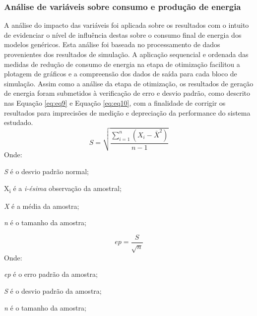 \subsubsection{Análise de variáveis sobre consumo e produção de energia}
\noindent A análise do impacto das variáveis foi aplicada sobre os resultados com o intuito de evidenciar o nível de influência destas sobre o consumo final de energia dos modelos genéricos. Esta análise foi baseada no processamento de dados provenientes dos resultados de simulação. A aplicação sequencial e ordenada das medidas de redução de consumo de energia na etapa de otimização facilitou a plotagem de gráficos e a compreensão dos dados de saída para cada bloco de simulação.\newline
\noindent Assim como a análise da etapa de otimização, os resultados de geração de energia foram submetidos à verificação de erro e desvio padrão, como descrito nas Equação \ref{eq:eq9} e Equação \ref{eq:eq10}, com a finalidade de corrigir os resultados para imprecisões de medição e depreciação da performance do sistema estudado.\newline
\begin{equation}\label{eq:eq9}
    S=\sqrt{\frac{\sum_{i=1}^{n}(X_i-\bar{X}^2)}{n-1}}
\end{equation}
\noindent Onde:\par
\setlength\parindent{1.5cm} \textit{S} é o desvio padrão normal;\par
\setlength\parindent{1.5cm} X\textsubscript{i} é a \textit{i-ésima} observação da amostral;\par
\setlength\parindent{1.5cm} \textit{X} é a média da amostra;\par
\setlength\parindent{1.5cm} \textit{n} é o tamanho da amostra;\par
\begin{equation}\label{eq:eq10}
    ep=\frac{S}{\sqrt{n}}
\end{equation}
\noindent Onde:\par
\setlength\parindent{1.5cm} \textit{ep} é o erro padrão da amostra;\par
\setlength\parindent{1.5cm} \textit{S} é o desvio padrão da amostra;\par
\setlength\parindent{1.5cm} \textit{n} é o tamanho da amostra;\par